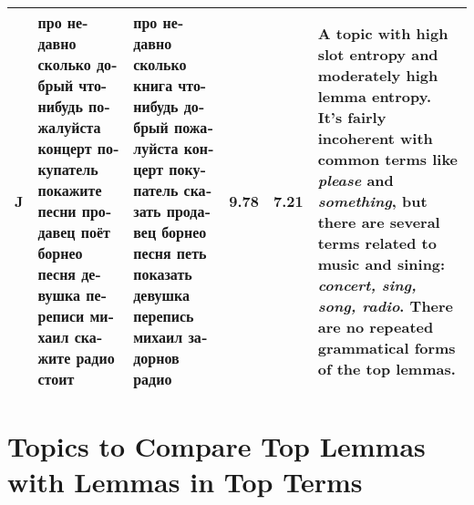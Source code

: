 \documentclass[11pt,a4paper]{article}
\begin{document}
\begin{landscape}
\begin{table*}[h!]
\begin{tabularx}{\textwidth}{|l|X|X|l|l|X|}
        J & \foreignlanguage{russian}{про недавно сколько добрый что-нибудь пожалуйста концерт покупатель покажите песни продавец поёт борнео песня девушка переписи михаил скажите радио стоит} & \foreignlanguage{russian}{про недавно сколько книга что-нибудь добрый пожалуйста концерт покупатель сказать продавец борнео песня петь показать девушка перепись михаил задорнов радио} & 9.78 & 7.21 & A topic with high slot entropy and moderately high lemma entropy. It's fairly incoherent with common terms like \textit{please} and \textit{something}, but there are several terms related to music and sining: \textit{concert, sing, song, radio}. There are no repeated grammatical forms of the top lemmas. \\ \hline
    \end{tabularx}
\end{table*}
\pagebreak
\section{Topics to Compare Top Lemmas with Lemmas in Top Terms}
\label{sec:poststem_topics}
\begin{table*}[h!]
    \centering


\end{table*}
\end{landscape}
\end{document}

